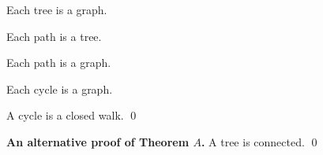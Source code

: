 \documentclass{article}
\begin{document}
 Each tree is a graph.

 Each path is a tree.

 Each path is a graph.

 Each cycle is a graph.

 A cycle is a closed walk. \qed

{\noindent\bf An alternative proof of Theorem $A$.} A tree is connected. \qed
\end{document}
